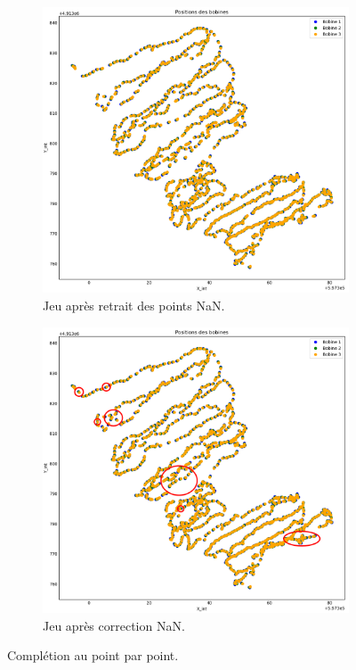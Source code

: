\documentclass[12pt]{article}
\begin{document}
    \begin{figure}[ht!]
        \centering
        \begin{subfigure}[b]{0.475\textwidth}
            \centering
            \includegraphics[width=\textwidth]{Images/NA_solo_Avant.png}
            \caption[]%
            {{ \small Jeu après retrait des points NaN.}}    
        \end{subfigure}
        \hfill
        \begin{subfigure}[b]{0.475\textwidth}  
            \centering 
            \includegraphics[width=\textwidth]{Images/NA_solo_Apres.png}
            \caption[]%
            {{\small Jeu après correction NaN.}}    
        \end{subfigure}
        \caption{Complétion au point par point.}
    \end{figure}
\end{document}
